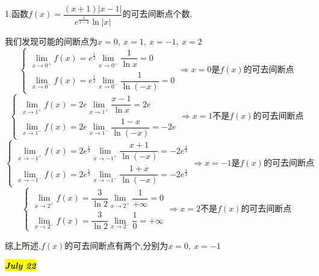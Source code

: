 1.函数$f(x)=\dfrac{(x+1)|x-1|}{e^{\frac{1}{x-2}}\ln|x|}$的可去间断点个数.
\begin{solution}
	
	我们发现可能的间断点为$x=0,\ x=1,\ x=-1,\ x=2$
	$$\left\lbrace
	\begin{array}{l}
		\lim\limits_{x\rightarrow 0^{+}}f(x)=e^{\frac{1}{2}}\lim\limits_{x\rightarrow 0^{+}}\dfrac{1}{\ln x}=0\\
		\lim\limits_{x\rightarrow 0^{-}}f(x)=e^{\frac{1}{2}}\lim\limits_{x\rightarrow 0^{-}}\dfrac{1}{\ln(-x)}=0
	\end{array}
	\right. \Rightarrow x=0\text{是}f(x)\text{的可去间断点}$$
	$$\left\lbrace
	\begin{array}{l}
		\lim\limits_{x\rightarrow 1^{+}}f(x)=2e\lim\limits_{x\rightarrow 1^{+}}\dfrac{x-1}{\ln x}=2e\\
		\lim\limits_{x\rightarrow 1^{-}}f(x)=2e\lim\limits_{x\rightarrow 1^{-}}\dfrac{1-x}{\ln(-x)}=-2e
	\end{array}
	\right. \Rightarrow x=1\text{不是}f(x)\text{的可去间断点}$$
	$$\left\lbrace
	\begin{array}{l}
		\lim\limits_{x\rightarrow -1^{+}}f(x)=2e^{\frac{1}{3}}\lim\limits_{x\rightarrow -1^{+}}\dfrac{x+1}{\ln(-x)}=-2e^{\frac{1}{3}}\\
		\lim\limits_{x\rightarrow -1^{-}}f(x)=2e^{\frac{1}{3}}\lim\limits_{x\rightarrow -1^{-}}\dfrac{1+x}{\ln(-x)}=-2e^{\frac{1}{3}}
	\end{array}
	\right. \Rightarrow x=-1\text{是}f(x)\text{的可去间断点}$$
	$$\left\lbrace
	\begin{array}{l}
		\lim\limits_{x\rightarrow 2^{+}}f(x)=\dfrac{3}{\ln 2}\lim\limits_{x\rightarrow 2^{+}}\dfrac{1}{+\infty}=0\\
		\lim\limits_{x\rightarrow 2^{-}}f(x)=\dfrac{3}{\ln 2}\lim\limits_{x\rightarrow 2^{-}}\dfrac{1}{0}=+\infty
	\end{array}
	\right. \Rightarrow x=2\text{不是}f(x)\text{的可去间断点}$$
	
	综上所述,$f(x)$的可去间断点有两个,分别为$x=0,\ x=-1$
\end{solution} 

\hl{\textbf{\textit{July 22}}}

